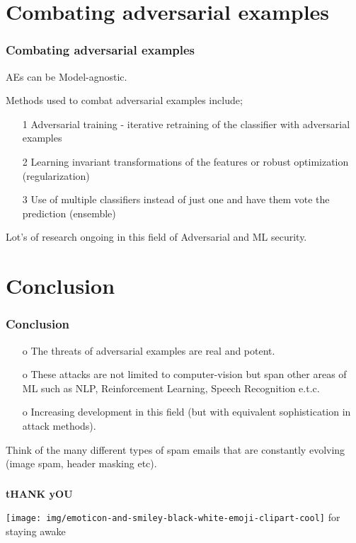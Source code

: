 \documentclass[12pt]{beamer}
\begin{document}
\section{Combating adversarial examples}
\begin{frame}
\frametitle{Combating adversarial examples}

AEs can be Model-agnostic.

Methods used to combat adversarial examples include\protect\footnotemark;
\begin{itemize}
	\item[1] Adversarial training - iterative retraining of the classifier with adversarial examples \pause
	\item[2] Learning invariant transformations of the features or robust optimization (regularization) \pause
	\item[3] Use of multiple classifiers instead of just one and have them vote the prediction (ensemble) \pause
\end{itemize}
{\small Lot's of research ongoing in this field of Adversarial and ML security.}

\end{frame}

\section{Conclusion}
\begin{frame}
\frametitle{Conclusion}
\begin{itemize}
	\item[o] The threats of adversarial examples are real and potent.
	\item[o] These attacks are not limited to computer-vision but span other areas of ML such as NLP, Reinforcement Learning, Speech Recognition e.t.c.
	\item[o] Increasing development in this field (but with equivalent sophistication in attack methods).
\end{itemize}
 
Think of the many different types of spam emails that are constantly evolving (image spam, header masking etc).
\end{frame}

\begin{frame}
\frametitle{}
\begin{center}
	\textbf{{\Huge tHANK yOU}}
\end{center}
\begin{center}
	\texttt{[image: img/emoticon-and-smiley-black-white-emoji-clipart-cool]}
	{\Large for staying awake}
\end{center}

\end{frame}
\end{document}
